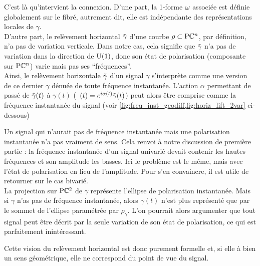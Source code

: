C'est là qu'intervient la connexion. D'une part, la 1-forme $\omega$ associée est définie globalement sur le fibré, autrement dit, elle est indépendante des représentations locales de $\gamma$.
\\
D'autre part, le relèvement horizontal $\Tilde{\gamma}$ d'une courbe $\rho\subset\text{\normalfont P}\mathbb{C}^{n}$, par définition, n'a pas de variation verticale. Dans notre cas, cela signifie que $\Tilde{\gamma}$ n'a pas de variation dans la direction de $\text{\normalfont U}(1)$, donc son état de polarisation (composante sur $\text{\normalfont P}\mathbb{C}^{n}$) varie mais pas ses ``fréquences''.
\\
Ainsi, le relèvement horizontale $\Tilde{\gamma}$ d'un signal $\gamma$ s'interprète comme une version de ce dernier $\gamma$ dénuée de toute fréquence instantanée.
L'action $\alpha$ permettant de passé de $\Tilde{\gamma}(t)$ à $\gamma(t)$ (\ie~$(t) = e^{i\alpha(t)} \Tilde{\gamma}(t)$) peut alors être comprise comme la fréquence instantanée du signal (voir \cref{fig:freq_inst_geodiff,fig:horiz_lift_2var} ci-dessous)	
\\

\begin{remarque}
	Un signal qui n'aurait pas de fréquence instantanée mais une polarisation instantanée n'a pas vraiment de sens. 
	Cela renvoi à notre discussion de première partie : la fréquence instantanée d'un signal univarié devait contenir les hautes fréquences et son amplitude les basses.
	Ici le problème est le même, mais avec l'état de polarisation en lieu de l’amplitude. Pour s'en convaincre, il est utile de retourner sur le cas bivarié.
	\\
	La projection sur $\text{\normalfont P}\mathbb{C}^{2}$ de $\gamma$ représente l'ellipse de polarisation instantanée. 
	Mais si $\gamma$ n'as pas de fréquence instantanée, alors $\gamma(t)$ n'est plus représenté que par le sommet de l’ellipse paramétrée par $\rho_\gamma$. 
	L'on pourrait alors argumenter que tout signal peut être décrit par la seule variation de son état de polarisation, ce qui est parfaitement inintéressant.
	
	Cette vision du relèvement horizontal est donc purement formelle et, si elle à bien un sens géométrique, elle ne correspond du point de vue du signal.
\end{remarque}
\skipl

